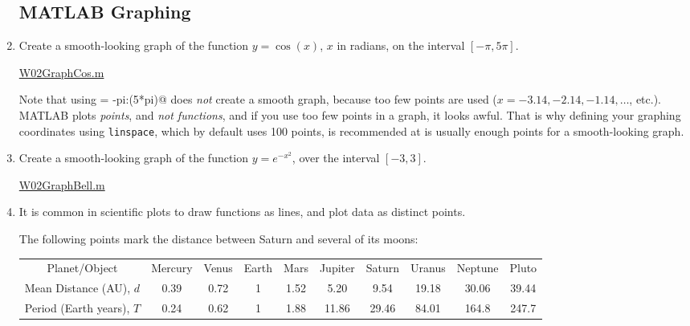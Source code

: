 \begin{enumerate}[1.]
\begin{multicols}{2}
\end{multicols}
\hrulefill

\subsection*{MATLAB Graphing}
\item 
  \begin{Question}
Create a smooth-looking graph of the function $y = \cos(x)$, $x$
  in radians, on the interval $[-\pi, 5\pi]$.
  \end{Question}
  \begin{Solution}
    
\href{http://www.mast.queensu.ca/~apsc171/MNTCP01/PracticeProblems/MATLAB/W02GraphCos.m}{W02GraphCos.m}



Note that using \verb@x = -pi:(5*pi)@ does {\em not} create a smooth
graph, because too few points are used
($x = -3.14, -2.14, -1.14, \ldots$, etc.).  MATLAB plots {\em points},
and {\em not functions}, and if you use too few points in a graph, it
looks awful. That is why defining your graphing \verb@x@ coordinates
using \texttt{linspace}, which by default uses 100 points, is
recommended at is usually enough points for a smooth-looking graph.
  \end{Solution}

\item 
  \begin{Question}
Create a smooth-looking graph of the function $y = e^{-x^2}$,
  over the interval $[-3, 3]$.
  \end{Question}
\begin{Solution}
\href{http://www.mast.queensu.ca/~apsc171/MNTCP01/PracticeProblems/MATLAB/W02GraphBell.m}{W02GraphBell.m}


\end{Solution}

\item 
  \begin{Question}
    It is common in scientific plots to draw functions as lines, and
    plot data as distinct points.

    The following points mark the distance between Saturn and several
    of its moons:

\begin{tabular}{cccccccccc}
Planet/Object & Mercury& 	Venus& 	Earth& 	Mars& 	Jupiter& 	Saturn& 	Uranus& 	Neptune& 	Pluto \\
Mean Distance (AU), $d$& 0.39& 	0.72& 	1& 	1.52& 	5.20& 	9.54& 	19.18& 	30.06& 	39.44 \\
Period (Earth years), $T$  & 0.24&	0.62&	1&	1.88&	11.86&	29.46&	84.01&	164.8&	247.7 \\
\end{tabular}


\end{Question}
\end{enumerate}
